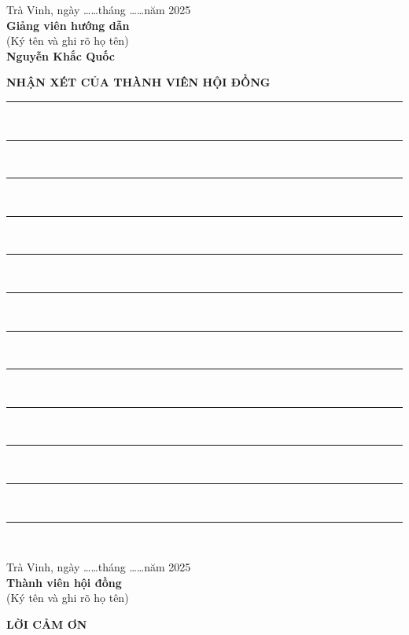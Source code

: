 \documentclass[a4paper,12pt]{report}
\begin{document}
\vspace{2cm}
\begin{flushright}
Trà Vinh, ngày \ldots\ldots tháng \ldots\ldots năm 2025\\[1cm]
\textbf{Giảng viên hướng dẫn}\\
(Ký tên và ghi rõ họ tên)\\[2cm]
\textbf{Nguyễn Khắc Quốc}
\end{flushright}

\newpage
\thispagestyle{empty}
\begin{center}
\textbf{\Large NHẬN XÉT CỦA THÀNH VIÊN HỘI ĐỒNG}
\end{center}
\vspace{1cm}
\noindent\rule{\linewidth}{0.4pt}\\[0.5cm]
\noindent\rule{\linewidth}{0.4pt}\\[0.5cm]
\noindent\rule{\linewidth}{0.4pt}\\[0.5cm]
\noindent\rule{\linewidth}{0.4pt}\\[0.5cm]
\noindent\rule{\linewidth}{0.4pt}\\[0.5cm]
\noindent\rule{\linewidth}{0.4pt}\\[0.5cm]
\noindent\rule{\linewidth}{0.4pt}\\[0.5cm]
\noindent\rule{\linewidth}{0.4pt}\\[0.5cm]
\noindent\rule{\linewidth}{0.4pt}\\[0.5cm]
\noindent\rule{\linewidth}{0.4pt}\\[0.5cm]
\noindent\rule{\linewidth}{0.4pt}\\[0.5cm]
\noindent\rule{\linewidth}{0.4pt}\\[0.5cm]

\vspace{2cm}
\begin{flushright}
Trà Vinh, ngày \ldots\ldots tháng \ldots\ldots năm 2025\\[1cm]
\textbf{Thành viên hội đồng}\\
(Ký tên và ghi rõ họ tên)\\[2cm]
\end{flushright}

\newpage
\thispagestyle{empty}
\begin{center}
\textbf{\Large LỜI CẢM ƠN}
\end{center}
\vspace{1cm}
\end{document}
